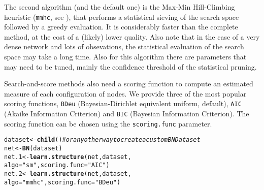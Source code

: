 \documentclass{article}\usepackage[]{graphicx}\usepackage[]{color}
\makeatletter
\newcommand{\hlstr}[1]{\textcolor[rgb]{0.192,0.494,0.8}{#1}}%
\newcommand{\hlcom}[1]{\textcolor[rgb]{0.678,0.584,0.686}{\textit{#1}}}%
\newcommand{\hlstd}[1]{\textcolor[rgb]{0.345,0.345,0.345}{#1}}%
\newcommand{\hlkwb}[1]{\textcolor[rgb]{0.69,0.353,0.396}{#1}}%
\newcommand{\hlkwc}[1]{\textcolor[rgb]{0.333,0.667,0.333}{#1}}%
\newcommand{\hlkwd}[1]{\textcolor[rgb]{0.737,0.353,0.396}{\textbf{#1}}}%
\newenvironment{kframe}{%
 \def\at@end@of@kframe{}%
 \ifinner\ifhmode%
  \def\at@end@of@kframe{\end{minipage}}%
  \begin{minipage}{\columnwidth}%
 \fi\fi%
 \def\FrameCommand##1{\hskip\@totalleftmargin \hskip-\fboxsep
 \colorbox{shadecolor}{##1}\hskip-\fboxsep
     \hskip-\linewidth \hskip-\@totalleftmargin \hskip\columnwidth}%
 \MakeFramed {\advance\hsize-\width
   \@totalleftmargin\z@ \linewidth\hsize
   \@setminipage}}%
 {\par\unskip\endMakeFramed%
 \at@end@of@kframe}
\newenvironment{knitrout}{}{} %
\newcommand{\Robject}[1]{{\texttt{#1}}}
\newcommand{\Rmethod}[1]{{\texttt{#1}}}
\makeatother
\begin{document}
The second algorithm (and the default one) is the Max-Min Hill-Climbing heuristic (\texttt{mmhc}, see \citet*{tsamardinos2006max}), that performs a statistical
sieving of the search space followed by a greedy evaluation. It is considerably faster than the complete method, at the cost of a (likely)
lower quality. Also note that in the case of a very dense network and lots of obsevations, the statistical evaluation
of the search space may take a long time. Also for this algorithm there are parameters that may need to be tuned,
mainly the confidence threshold of the statistical pruning.

Search-and-score methods also need a scoring function to compute an estimated measure of each configuration of nodes.
We provide three of the most popular scoring functions, \texttt{BDeu} (Bayesian-Dirichlet equivalent uniform, default),
\texttt{AIC} (Akaike Information Criterion) and \texttt{BIC} (Bayesian Information Criterion). The scoring function
can be chosen using the \texttt{scoring.func} parameter.

\begin{knitrout}
\color{fgcolor}\begin{kframe}
\begin{alltt}
\hlstd{dataset} \hlkwb{<-} \hlkwd{child}\hlstd{()} \hlcom{# or any other way to create a custom BNDataset}
\hlstd{net}     \hlkwb{<-} \hlkwd{BN}\hlstd{(dataset)}
\hlstd{net.1}   \hlkwb{<-} \hlkwd{learn.structure}\hlstd{(net, dataset,}
                           \hlkwc{algo} \hlstd{=} \hlstr{"sm"}\hlstd{,} \hlkwc{scoring.func} \hlstd{=} \hlstr{"AIC"}\hlstd{)}
\hlstd{net.2}   \hlkwb{<-} \hlkwd{learn.structure}\hlstd{(net, dataset,}
                           \hlkwc{algo} \hlstd{=} \hlstr{"mmhc"}\hlstd{,} \hlkwc{scoring.func} \hlstd{=} \hlstr{"BDeu"}\hlstd{)}
\end{alltt}
\end{kframe}
\end{knitrout}

\end{document}
